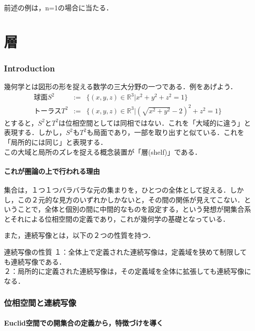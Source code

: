 \documentclass[uplatex, 12pt, a4paper, dvipdfmx]{jsarticle}
\begin{document}
前述の例は，n=1の場合に当たる．

\part{層}

\section{Introduction}

幾何学とは図形の形を捉える数学の三大分野の一つである．例をあげよう．
\begin{eqnarray*}球面S^2 &:=& \{ (x,y,z) \in \mathbb{R}^3 | x^2+y^2+z^2 = 1 \} \\ トーラスT^2 &:=& \{ (x,y,z)\in\mathbb{R}^3 | (\sqrt{x^2+y^2}-2)^2 + z^2 = 1 \}\end{eqnarray*}
とすると，$S^2$と$T^2$は位相空間としては同相ではない．これを「大域的に違う」と表現する．しかし，$S^2$も$T^2$も局面であり，一部を取り出すと似ている．これを「局所的には同じ」と表現する．\\
この大域と局所のズレを捉える概念装置が「層(shelf)」である．

\subsection{これが圏論の上で行われる理由}

集合は，１つ１つバラバラな元の集まりを，ひとつの全体として捉える．しかし，この２元的な見方のいずれかしかないと，その間の関係が見えてこない．ということで，全体と個別の間に中間的なものを設定する，という発想が開集合系とそれによる位相空間の定義であり，これが幾何学の基礎となっている．\par

また，連続写像とは，以下の２つの性質を持つ．
\begin{itembox}[l]{連続写像の性質}
    １：全体上で定義された連続写像は，定義域を狭めて制限しても連続写像である．\\
    ２：局所的に定義された連続写像は，その定義域を全体に拡張しても連続写像になる．
\end{itembox}

\section{位相空間と連続写像}

\subsection{Euclid空間での開集合の定義から，特徴づけを導く}
\end{document}
